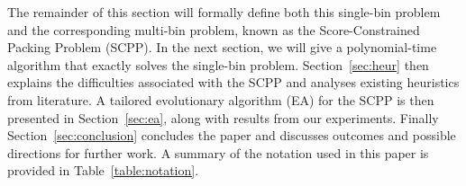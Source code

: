 \documentclass[a4paper,11pt,authoryear]{elsarticle}
\begin{document}
\noindent The remainder of this section will formally define both this single-bin problem and the corresponding multi-bin problem, known as the Score-Constrained Packing Problem (SCPP). In the next section, we will give a polynomial-time algorithm that exactly solves the single-bin problem. Section~\ref{sec:heur} then explains the difficulties associated with the SCPP and analyses existing heuristics from literature. A tailored evolutionary algorithm (EA) for the SCPP is then presented in Section~\ref{sec:ea}, along with results from our experiments. Finally Section~\ref{sec:conclusion} concludes the paper and discusses outcomes and possible directions for further work. A summary of the notation used in this paper is provided in Table~\ref{table:notation}.
\end{document}
